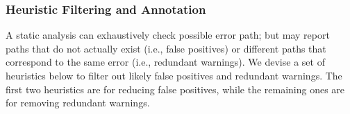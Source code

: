







\subsubsection{Heuristic Filtering and Annotation}
\label{sec:heuristic}

A static analysis can exhaustively check possible error path; but may report
paths that do not actually exist (i.e., false positives) or different paths
 that correspond to the same error (i.e., redundant warnings). We devise
a set of heuristics below to filter out likely false positives and redundant warnings.
The first two heuristics are for reducing false positives, while the
remaining ones are for removing redundant warnings.



